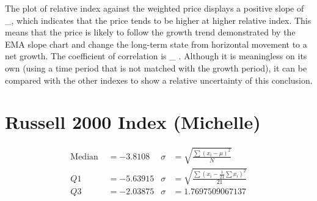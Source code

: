 \documentclass{article}
\begin{document}
\begin{center}
\end{center}


The plot of relative index against the weighted price displays a positive slope of \_, which indicates that the price tends to be higher at higher relative index. This means that the price is likely to follow the growth trend demonstrated by the EMA slope chart and change the long-term state from horizontal movement to a net growth. The coefficient of correlation is \_ . Although it is meaningless on its own (using a time period that is not matched with the growth period), it can be compared with the other indexes to show a relative uncertainty of this conclusion.


\pagebreak
\section{Russell 2000 Index (Michelle)}

\begin{align*}
    \text{Median }&=-3.8108     &        \sigma&=\sqrt{\frac{\sum\left(x_i-\mu\right)^2}{N}}\\
    Q1&=-5.63915     &  \sigma    &=\sqrt{\frac{\sum\left(x_i-\frac{1}{21}\sum x_i\right)^2}{21}}\\
    Q3&=-2.03875 &        \sigma &=1.7697509067137
\end{align*}
\end{document}
